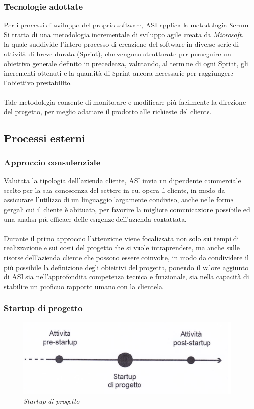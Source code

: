 \subsubsection{Tecnologie adottate}
Per i processi di sviluppo del proprio software, ASI applica la metodologia Scrum.\\
Si tratta di una metodologia incrementale di sviluppo agile creata da \textit{Microsoft}. la quale suddivide l'intero processo di creazione del software in diverse serie di attività di breve durata (Sprint), che vengono strutturate per perseguire un obiettivo generale definito in precedenza, valutando, al termine di ogni Sprint, gli incrementi ottenuti e la quantità di Sprint ancora necessarie per raggiungere l'obiettivo prestabilito.
\\\\
Tale metodologia consente di monitorare e modificare più facilmente la direzione del progetto, per meglio adattare il prodotto alle richieste del cliente.
\subsection{Processi esterni}
\subsubsection{Approccio consulenziale}
Valutata la tipologia dell'azienda cliente, ASI invia un dipendente commerciale scelto per la sua conoscenza del settore in cui opera il cliente, in modo da assicurare l'utilizzo di un linguaggio largamente condiviso, anche nelle forme gergali cui il cliente è abituato, per favorire la migliore comunicazione possibile ed una analisi più efficace delle esigenze dell'azienda contattata.
\\\\
Durante il primo approccio l'attenzione viene focalizzata non solo sui tempi di realizzazione e sui costi del progetto che si vuole intraprendere, ma anche sulle risorse dell'azienda cliente che possono essere coinvolte, in modo da condividere il più possibile la definizione degli obiettivi del progetto, ponendo il valore aggiunto di ASI sia nell'approfondita competenza tecnica e funzionale, sia nella capacità di stabilire un proficuo rapporto umano con la clientela.
\subsubsection{Startup di progetto}

\begin{figure}[ht]
	\centering
	\includegraphics[scale=0.25]{immagini/azienda/startup_di_progetto}
	\caption{\textit{Startup di progetto}}
\end{figure}\FloatBarrier

